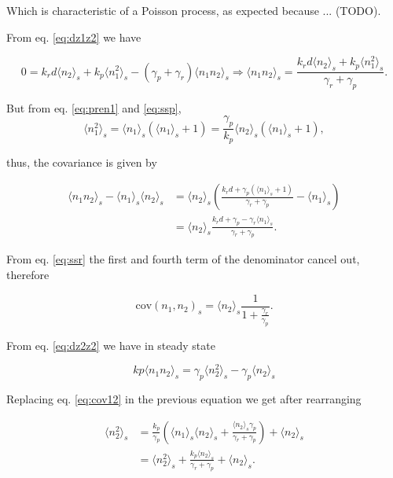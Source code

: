 Which is characteristic of a Poisson process, as expected because ... (TODO).

From eq. \ref{eq:dz1z2} we have

\begin{equation*}
0 = k_rd \langle n_2 \rangle_s + k_p \langle n_1^2 \rangle_s - (\gamma_p + \gamma_r) \langle n_1n_2 \rangle_s \Rightarrow \langle n_1n_2 \rangle_s  = \frac{k_rd\langle n_2\rangle_s+k_p\langle n_1^2\rangle_s}{\gamma_r+\gamma_p}.
\end{equation*}

But from eq. \ref{eq:pren1} and \ref{eq:ssp},
\begin{equation}
\langle n_1^2 \rangle_s = \langle n_1 \rangle_s\left( \langle n_1 \rangle_s+1\right) = \frac{\gamma_p}{k_p}\langle n_2 \rangle_s\left(\langle n_1\rangle_s + 1\right),
\end{equation}

thus, the covariance is given by

\begin{align*}
\langle n_1n_2 \rangle_s - \langle n_1 \rangle_s\langle n_2\rangle_s &= \langle n_2 \rangle_s \left(\frac{k_rd+\gamma_p\left(\langle n_1\rangle_s+1\right)}{\gamma_r+\gamma_p}-\langle n_1\rangle_s\right)\\
&=\langle n_2\rangle_s\frac{k_rd+\gamma_p-\gamma_r\langle n_1\rangle_s}{\gamma_r+\gamma_p}.
\end{align*}

From eq. \ref{eq:ssr} the first and fourth term of the denominator cancel out, therefore

\begin{equation}
\label{eq:cov12}
\boxed{\text{cov}(n_1,n_2)_s = \langle n_2 \rangle_s\frac{1}{1+\frac{\gamma_r}{\gamma_p}}}.
\end{equation}

From eq. \ref{eq:dz2z2} we have in steady state

\begin{equation*}
kp\langle n_1n_2\rangle_s = \gamma_p\langle n_2^2\rangle_s-\gamma_p\langle n_2\rangle_s
\end{equation*}

Replacing eq. \ref{eq:cov12} in the previous equation we get after rearranging

\begin{align*}
\langle n_2^2\rangle_s &= \frac{k_p}{\gamma_p}\left(\langle n_1 \rangle_s\langle n_2\rangle_s + \frac{\langle n_2\rangle_s\gamma_p}{\gamma_r+\gamma_p}\right) + \langle n_2 \rangle_s\\
&=\langle n_2^2\rangle_s+\frac{k_p\langle n_2\rangle_s}{\gamma_r+\gamma_p}+\langle n_2 \rangle_s.
\end{align*}

